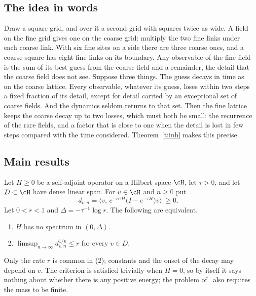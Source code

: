 \subsection{The idea in words}
Draw a square grid, and over it a second grid with squares twice as wide. A field on the fine grid gives one
on the coarse grid: multiply the two fine links under each coarse link. With six fine sites on a side there
are three coarse ones, and a coarse square has eight fine links on its boundary. Any observable of the fine
field is the sum of its best guess from the coarse field and a remainder, the detail that the coarse field
does not see. Suppose three things. The guess decays in time as on the coarse lattice. Every observable, whatever its guess,
loses within two steps a fixed fraction of its detail, except for detail carried by an exceptional set of coarse fields. And
the dynamics seldom returns to that set. Then the fine lattice keeps the coarse decay up to two losses, which must both
be small: the recurrence of the rare fields, and a factor that is close to one when the detail is lost in few
steps compared with the time considered. Theorem~\ref{t:inh} makes this precise.

\subsection{Main results}
\begin{theorem}\label{t:crit}
Let $H\ge0$ be a self-adjoint operator on a Hilbert space $\cH$, let $\tau>0$, and let $D\subset\cH$ have dense
linear span. For $v\in\cH$ and $n\ge0$ put
\[
d_{v,n}=\big\langle v,\,e^{-n\tau H}\big(I-e^{-\tau H}\big)v\big\rangle\ \ge0 .
\]
Let $0<r<1$ and $\Delta=-\tau^{-1}\log r$. The following are equivalent.
\begin{enumerate}
\item $H$ has no spectrum in $(0,\Delta)$.
\item $\limsup_{n\to\infty}d_{v,n}^{1/n}\le r$ for every $v\in D$.
\end{enumerate}
\end{theorem}

Only the rate $r$ is common in (2); constants and the onset of the decay may depend on $v$. The criterion is
satisfied trivially when $H=0$, so by itself it says nothing about whether there is any positive energy; the
problem of~\cite{JW} also requires the mass to be finite.


